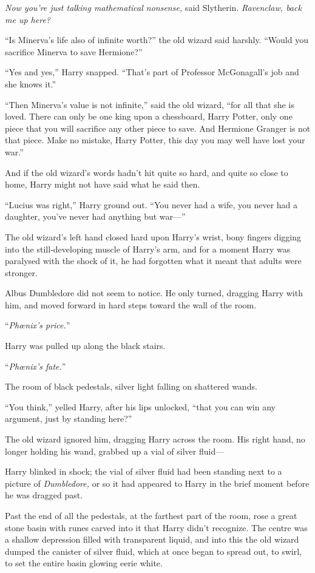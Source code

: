 \emph{Now you’re just talking mathematical nonsense,} said Slytherin. \emph{Ravenclaw, back me up here?}

“Is Minerva’s life also of infinite worth?” the old wizard said harshly. “Would you sacrifice Minerva to save Hermione?”

“Yes and yes,” Harry snapped. “That’s part of Professor McGonagall’s job and she knows it.”

“Then Minerva’s value is not infinite,” said the old wizard, “for all that she is loved. There can only be one king upon a chessboard, Harry Potter, only one piece that you will sacrifice any other piece to save. And Hermione Granger is not that piece. Make no mistake, Harry Potter, this day you may well have lost your war.”

And if the old wizard’s words hadn’t hit quite so hard, and quite so close to home, Harry might not have said what he said then.

“Lucius was right,” Harry ground out. “You never had a wife, you never had a daughter, you’ve never had anything but war—”

The old wizard’s left hand closed hard upon Harry’s wrist, bony fingers digging into the still-developing muscle of Harry’s arm, and for a moment Harry was paralysed with the shock of it, he had forgotten what it meant that adults were stronger.

Albus Dumbledore did not seem to notice. He only turned, dragging Harry with him, and moved forward in hard steps toward the wall of the room.

“\emph{Phœnix’s price.}”

Harry was pulled up along the black stairs.

“\emph{Phœnix’s fate.}”

The room of black pedestals, silver light falling on shattered wands.

“You think,” yelled Harry, after his lips unlocked, “that you can win any argument, just by standing here?”

The old wizard ignored him, dragging Harry across the room. His right hand, no longer holding his wand, grabbed up a vial of silver fluid—

Harry blinked in shock; the vial of silver fluid had been standing next to a picture of \emph{Dumbledore,} or so it had appeared to Harry in the brief moment before he was dragged past.

Past the end of all the pedestals, at the farthest part of the room, rose a great stone basin with runes carved into it that Harry didn’t recognize. The centre was a shallow depression filled with transparent liquid, and into this the old wizard dumped the canister of silver fluid, which at once began to spread out, to swirl, to set the entire basin glowing eerie white.

